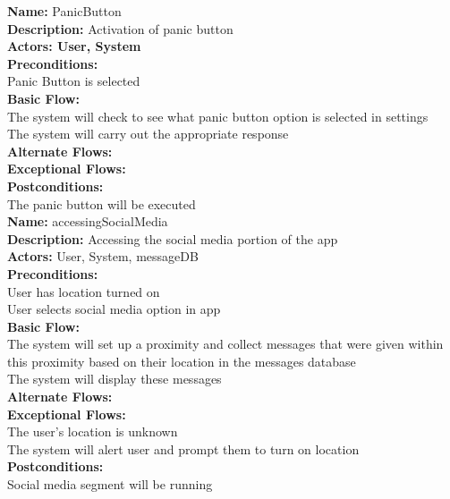 \documentclass[a4paper]{report}
\begin{document}
\textbf{Name:} PanicButton\\
\textbf{Description:} Activation of panic button\\ 
\textbf{Actors: User, System}\\
\textbf{Preconditions:}\\
Panic Button is selected\\
\textbf{Basic Flow:} \\
The system will check to see what panic button option is selected in settings\\
The system will carry out the appropriate response\\
\textbf{Alternate Flows:}\\
\textbf{Exceptional Flows:}\\
\textbf{Postconditions:}\\
The panic button will be executed \\



\textbf{Name:} accessingSocialMedia\\
\textbf{Description:} Accessing the social media portion of the app\\
\textbf{Actors:} User, System, messageDB\\
\textbf{Preconditions:}\\
User has location turned on \\
User selects social media option in app\\
\textbf{Basic Flow:} \\
The system will set up a proximity and collect messages that were given within this proximity based on their location in the messages database\\
The system will display these messages\\
\textbf{Alternate Flows:}\\
\textbf{Exceptional Flows:} \\
The user’s location is unknown \\
The system will alert user and prompt them to turn on location\\
\textbf{Postconditions:}\\
Social media segment will be running\\
\end{document}
